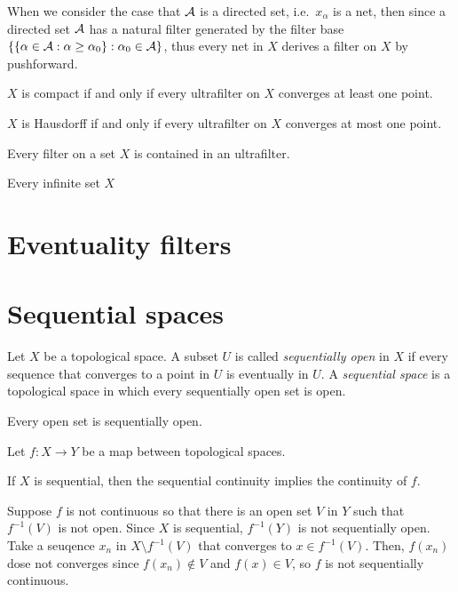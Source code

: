 \documentclass{../../large}
\begin{document}
When we consider the case that $\mathcal{A}$ is a directed set, i.e.~$x_\alpha$ is a net, then since a directed set $\mathcal{A}$ has a natural filter generated by the filter base $\{\{\alpha\in\mathcal{A}:\alpha\ge\alpha_0\}:\alpha_0\in\mathcal{A}\}$, thus every net in $X$ derives a filter on $X$ by pushforward.

\begin{prb}
\begin{parts}
\item $X$ is compact if and only if every ultrafilter on $X$ converges at least one point.
\item $X$ is Hausdorff if and only if every ultrafilter on $X$ converges at most one point.
\end{parts}
\end{prb}

\begin{prb}
\begin{parts}
\item Every filter on a set $X$ is contained in an ultrafilter.
\item Every infinite set $X$
\end{parts}
\end{prb}

\section{Eventuality filters}
\section{Sequential spaces}



\begin{prb}
Let $X$ be a topological space.
A subset $U$ is called \emph{sequentially open} in $X$ if every sequence that converges to a point in $U$ is eventually in $U$.
A \emph{sequential space} is a topological space in which every sequentially open set is open.
\begin{parts}
\item Every open set is sequentially open.
\item
\end{parts}
\end{prb}

\begin{prb}
Let $f:X\to Y$ be a map between topological spaces.
\begin{parts}
\item If $X$ is sequential, then the sequential continuity implies the continuity of $f$.
\end{parts}
\end{prb}
\begin{pf}
Suppose $f$ is not continuous so that there is an open set $V$ in $Y$ such that $f^{-1}(V)$ is not open.
Since $X$ is sequential, $f^{-1}(Y)$ is not sequentially open.
Take a seuqence $x_n$ in $X\setminus f^{-1}(V)$ that converges to $x\in f^{-1}(V)$.
Then, $f(x_n)$ dose not converges since $f(x_n)\notin V$ and $f(x)\in V$, so $f$ is not sequentially continuous.
\end{pf}
\end{document}
